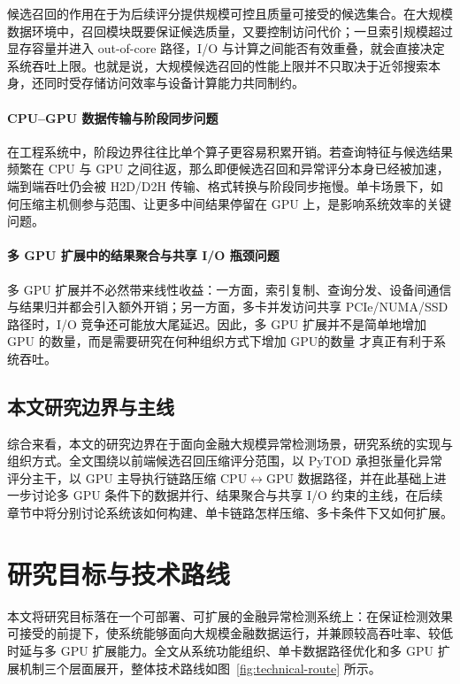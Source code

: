 候选召回的作用在于为后续评分提供规模可控且质量可接受的候选集合。在大规模数据环境中，召回模块既要保证候选质量，又要控制访问代价；一旦索引规模超过显存容量并进入 out-of-core 路径，I/O 与计算之间能否有效重叠，就会直接决定系统吞吐上限。也就是说，大规模候选召回的性能上限并不只取决于近邻搜索本身，还同时受存储访问效率与设备计算能力共同制约。

\paragraph{CPU--GPU 数据传输与阶段同步问题}

在工程系统中，阶段边界往往比单个算子更容易积累开销。若查询特征与候选结果频繁在 CPU 与 GPU 之间往返，那么即便候选召回和异常评分本身已经被加速，端到端吞吐仍会被 H2D/D2H 传输、格式转换与阶段同步拖慢。单卡场景下，如何压缩主机侧参与范围、让更多中间结果停留在 GPU 上，是影响系统效率的关键问题。

\paragraph{多 GPU 扩展中的结果聚合与共享 I/O 瓶颈问题}

多 GPU 扩展并不必然带来线性收益：一方面，索引复制、查询分发、设备间通信与结果归并都会引入额外开销；另一方面，多卡并发访问共享 PCIe/NUMA/SSD 路径时，I/O 竞争还可能放大尾延迟。因此，多 GPU 扩展并不是简单地增加 GPU 的数量，而是需要研究在何种组织方式下增加 GPU的数量 才真正有利于系统吞吐。

\subsection{本文研究边界与主线}

综合来看，本文的研究边界在于面向金融大规模异常检测场景，研究系统的实现与组织方式。全文围绕以前端候选召回压缩评分范围，以 PyTOD 承担张量化异常评分主干，以 GPU 主导执行链路压缩 CPU$\leftrightarrow$GPU 数据路径，并在此基础上进一步讨论多 GPU 条件下的数据并行、结果聚合与共享 I/O 约束的主线，在后续章节中将分别讨论系统该如何构建、单卡链路怎样压缩、多卡条件下又如何扩展。


\section{研究目标与技术路线}

本文将研究目标落在一个可部署、可扩展的金融异常检测系统上：在保证检测效果可接受的前提下，使系统能够面向大规模金融数据运行，并兼顾较高吞吐率、较低时延与多 GPU 扩展能力。全文从系统功能组织、单卡数据路径优化和多 GPU 扩展机制三个层面展开，整体技术路线如图~\ref{fig:technical-route} 所示。

